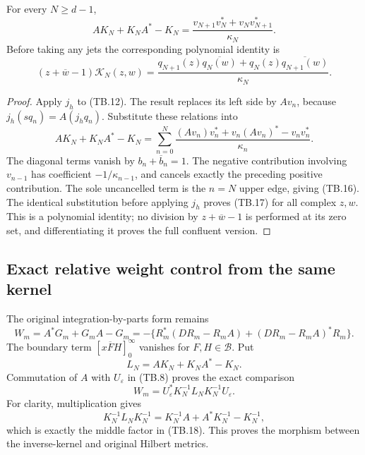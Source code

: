 \begin{theorem}
For every \(N\geq d-1\),
\[
 \boxed{A K_N+K_NA^*-K_N
  =\frac{v_{N+1}v_N^*+v_Nv_{N+1}^*}{\kappa_N}.}
 \tag{TB.16}
\]
Before taking any jets the corresponding polynomial identity is
\[
 (z+\overline w-1)\mathcal K_N(z,w)
 =\frac{q_{N+1}(z)\overline{q_N(w)}
        +q_N(z)\overline{q_{N+1}(w)}}{\kappa_N}.
 \tag{TB.17}
\]
\end{theorem}

\begin{proof}
Apply \(j_h\) to (TB.12).  The result replaces its left side by
\(Av_n\), because \(j_h(sq_n)=A(j_hq_n)\).  Substitute these
relations into
\[
 AK_N+K_NA^*-K_N
 =\sum_{n=0}^N
 \frac{(Av_n)v_n^*+v_n(Av_n)^*-v_nv_n^*}{\kappa_n}.
\]
The diagonal terms vanish by \(b_n+\overline b_n=1\).
The negative contribution involving \(v_{n-1}\) has coefficient
\(-1/\kappa_{n-1}\), and cancels exactly the preceding positive
contribution.  The sole uncancelled term is the \(n=N\) upper
edge, giving (TB.16).  The identical substitution before applying
\(j_h\) proves (TB.17) for all complex \(z,w\).  This is a polynomial
identity; no division by \(z+\overline w-1\) is performed at its
zero set, and differentiating it proves the full confluent version.
\end{proof}

\subsection{Exact relative weight control from the same kernel}

The original integration-by-parts form remains
\[
 W_m=A^*G_m+G_mA-G_m
 =-\{R_m^*(DR_m-R_mA)+(DR_m-R_mA)^*R_m\}.
 \tag{TB.18}
\]
The boundary term \([x\overline F H]_0^\infty\) vanishes for
\(F,H\in\mathscr B\).  Put
\[
 L_N=AK_N+K_NA^*-K_N.
\]
Commutation of \(A\) with \(U_\varepsilon\) in (TB.8) proves the
exact comparison
\[
 \boxed{W_m=U_\varepsilon^*K_N^{-1}L_NK_N^{-1}U_\varepsilon.}
 \tag{TB.19}
\]
For clarity, multiplication gives
\[
 K_N^{-1}L_NK_N^{-1}
 =K_N^{-1}A+A^*K_N^{-1}-K_N^{-1},
\]
which is exactly the middle factor in (TB.18).  This proves the
morphism between the inverse-kernel and original Hilbert metrics.

